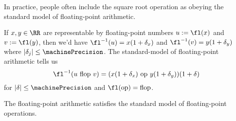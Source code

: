 \begin{rmk}
  In practice, people often include the square root operation as obeying
  the standard model of floating-point arithmetic.
\end{rmk}
\begin{rmk}
  If $x,y\in\RR$ are representable by floating-point numbers $u:=\fl(x)$
  and $v:=\fl(y)$, then we'd have $\fl^{-1}(u)=x(1 + \delta_{x})$ and
  $\fl^{-1}(v)=y(1+\delta_{y})$ where $|\delta_{j}|\leq\machinePrecision$.
  The standard-model of floating-point arithmetic tells us
  \begin{equation}
    \fl^{-1}(u~\mbox{flop}~v) = (x(1+\delta_{x})~\mbox{op}~y(1+\delta_{y}))(1+\delta)
  \end{equation}
  for $|\delta|\leq\machinePrecision$ and $\fl(\mbox{op})=\mbox{flop}$.
\end{rmk}

\begin{thm}
  The  floating-point arithmetic satisfies the standard model
  of floating-point operations.
\end{thm}

